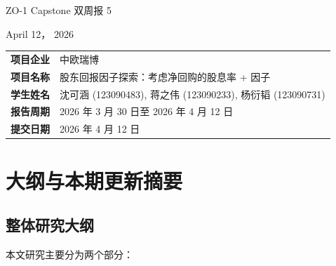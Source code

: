 \documentclass[a4paper,10pt]{article}
\begin{document}
\begin{center}
    \vspace*{1cm}
    {\Huge ZO-1 Capstone 双周报 5}
    
    \vspace{2.2cm}
    {\Large April 12， 2026}
    
    \vspace{1.2cm}
    \renewcommand{\arraystretch}{1.5}
    \begin{tabular}{@{} >{\bfseries}l l @{}}
        \toprule[1.5pt]
        项目企业 & 中欧瑞博 \\
        项目名称 & 股东回报因子探索：考虑净回购的股息率 + 因子 \\
        学生姓名 & 沈可涵 (123090483), 蒋之伟 (123090233), 杨衍韬 (123090731) \\
        报告周期 & 2026 年 3 月 30 日至 2026 年 4 月 12 日 \\
        提交日期 & 2026 年 4 月 12 日 \\
        \bottomrule[1.5pt]
    \end{tabular}
\end{center}

\newpage
\tableofcontents
\newpage


\section{大纲与本期更新摘要}

\subsection{整体研究大纲}

本文研究主要分为两个部分：
\end{document}

